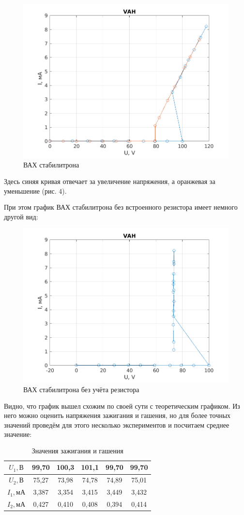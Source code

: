 \begin{figure}[h!]
    \centering
    \includegraphics[width = 10 cm]{images/VAH.png}
    \caption{ВАХ стабилитрона}
    \label{vah}
\end{figure}

Здесь синяя кривая отвечает за увеличение напряжения, а оранжевая за уменьшение (рис. 4).

При этом график ВАХ стабилитрона без встроенного резистора имеет немного другой вид:

\begin{figure}[h!]
    \centering
    \includegraphics[width = 10 cm]{images/VAH2.png}
    \caption{ВАХ стабилитрона без учёта резистора}
    \label{vah2}
\end{figure}


Видно, что график вышел схожим по своей сути с теоретическим графиком.
Из него можно оценить напряжения зажигания и гашения, но для более точных значений проведём для этого несколько экспериментов и посчитаем среднее значение:

\begin{table}[h]
    \centering
    \begin{tabular}{|c|c|c|c|c|c|}
        \hline
        \textbf{$U_1, В$}  & 99,70 & 100,3  & 101,1  & 99,70 & 99,70 \\ \hline
        \textbf{$U_2, В$}  & 75,27 & 73,98  & 74,78  & 74,89 & 75,01 \\ \hline
        \textbf{$I_1, мА$} & 3,387 & 3,354  & 3,415  & 3,449 & 3,432 \\ \hline
        \textbf{$I_2, мА$} & 0,427 & 0,410  & 0,408  & 0,394 & 0,414 \\ \hline
    \end{tabular}
    \caption{Значения зажигания и гашения}
\end{table}

